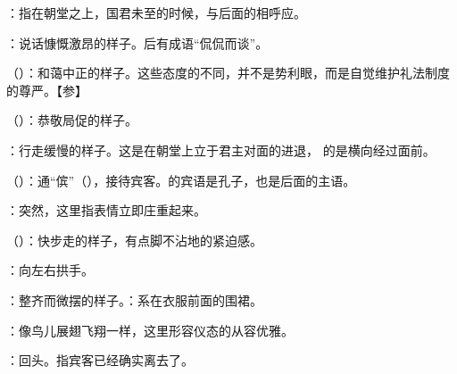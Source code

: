 {
\item {}：指在朝堂之上，国君未至的时候，与后面的相呼应。
\item {}：说话慷慨激昂的样子。后有成语“侃侃而谈”。
\item {}（）：和蔼中正的样子。这些态度的不同，并不是势利眼，而是自觉维护礼法制度的尊严。【参】 
\item {}（）：恭敬局促的样子。
\item {}：行走缓慢的样子。这是在朝堂上立于君主对面的进退， 的是横向经过面前。
}
{}  %


{
\item {}（）：通“傧”（），接待宾客。的宾语是孔子，也是后面的主语。
\item {}：突然，这里指表情立即庄重起来。
\item {}（）：快步走的样子，有点脚不沾地的紧迫感。
\item {}：向左右拱手。
\item {}：整齐而微摆的样子。：系在衣服前面的围裙。
\item {}：像鸟儿展翅飞翔一样，这里形容仪态的从容优雅。
\item {}：回头。指宾客已经确实离去了。
}
{}


